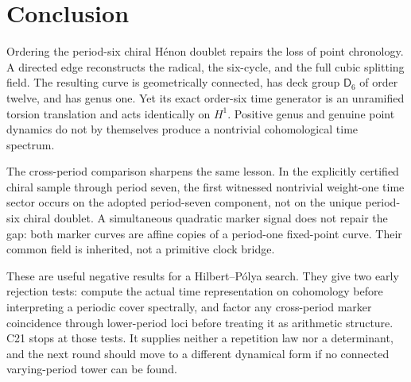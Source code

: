 \section{Conclusion}

Ordering the period-six chiral H\'enon doublet repairs the loss of point
chronology.  A directed edge reconstructs the radical, the six-cycle, and
the full cubic splitting field.  The resulting curve is geometrically
connected, has deck group $\mathsf D_6$ of order twelve, and has genus one.
Yet its exact order-six time generator is an unramified torsion translation
and acts identically on $H^1$.  Positive genus and genuine point dynamics do
not by themselves produce a nontrivial cohomological time spectrum.

The cross-period comparison sharpens the same lesson.  In the explicitly
certified chiral sample through period seven, the first witnessed nontrivial
weight-one time sector occurs on the adopted period-seven component, not on
the unique period-six chiral doublet.  A simultaneous quadratic marker
signal does not repair the gap: both marker curves are affine copies of a
period-one fixed-point curve.  Their common field is inherited, not a
primitive clock bridge.

These are useful negative results for a Hilbert--P\'olya search.  They give
two early rejection tests: compute the actual time representation on
cohomology before interpreting a periodic cover spectrally, and factor any
cross-period marker coincidence through lower-period loci before treating
it as arithmetic structure.  C21 stops at those tests.  It supplies neither
a repetition law nor a determinant, and the next round should move to a
different dynamical form if no connected varying-period tower can be found.

